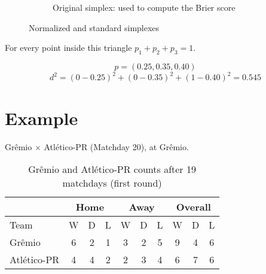 \documentclass[journal,article,accept,moreauthors,pdftex,12pt,a4paper]{mdpi}
\begin{document}
\begin{figure}[!ht]
\begin{subfigure}[b]{0.48\linewidth}


        \caption{Original simplex: used to compute the Brier score}
        \label{fig:B}
    \end{subfigure}
    \caption{Normalized and standard simplexes}
    \label{fig:norm_stand}
\end{figure}



For every point inside this triangle $p_1+p_2+p_3=1$.



\[p=(0.25,0.35,0.40)\]
\[d^2=(0-0.25)^2+(0-0.35)^2+(1-0.40)^2=0.545\]


\section{Example}

Gr\^emio $\times$ Atl\'etico-PR (Matchday 20), at Gr\^emio.

\begin{table}[h]
\begin{center}
\begin{tabular}{lccccccccc}

\hline
 & \multicolumn{3}{c}{Home} & \multicolumn{3}{c}{Away}& \multicolumn{3}{c}{Overall} \\
\hline
\hline
Team & W & D & L & W & D & L & W & D & L\\
\hline
Gr\^emio & 6 & 2 & 1 & 3 & 2 & 5 & 9 & 4 & 6\\
Atl\'etico-PR & 4 & 4 & 2 & 2 & 3 & 4 & 6 & 7 & 6\\
\hline
\end{tabular}
\caption{Gr\^emio and Atl\'etico-PR counts after 19 matchdays (first round)}
\end{center}
\end{table}
\end{document}
